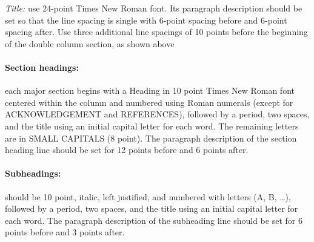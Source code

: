 \documentclass{ijisa}
\begin{document}
\textit{Title:} use 24-point Times New Roman font. Its paragraph description should be set so that the line spacing is single with 6-point spacing before and 6-point spacing after. Use three additional line spacings of 10 points before the beginning of the double column section, as shown above

\paragraph{Section headings:} each major section begins with a Heading in 10 point Times New Roman font centered within the column and numbered using Roman numerals (except for ACKNOWLEDGEMENT and REFERENCES), followed by a period, two spaces, and the title using an  initial capital letter for each word. The remaining letters are in SMALL CAPITALS (8 point). The paragraph description of the section heading line should be set for 12 points before and 6 points after. 

\paragraph{Subheadings:}should be 10 point, italic, left justified, and numbered with letters (A, B, …), followed by a period, two spaces, and the title using an initial capital letter for each word. The paragraph description of the subheading line should be set for 6 points before and 3 points after. 



\end{document}
